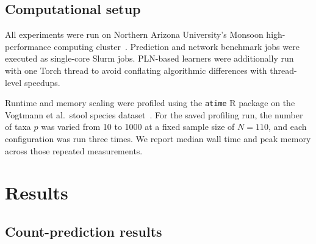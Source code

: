 \documentclass{jmlr}
\begin{document}
\subsection{Computational setup}
\label{subsec:computational-setup}

All experiments were run on Northern Arizona University's Monsoon high-performance computing cluster~\cite{Buechler2025MonsoonIntro}.
Prediction and network benchmark jobs were executed as single-core Slurm jobs.
PLN-based learners were additionally run with one Torch thread to avoid conflating algorithmic differences with thread-level speedups.

Runtime and memory scaling were profiled using the \texttt{atime} R package on the Vogtmann et al.\ stool species dataset~\cite{Vogtmann2016CRC}.
For the saved profiling run, the number of taxa $p$ was varied from 10 to 1000 at a fixed sample size of $N=110$, and each configuration was run three times.
We report median wall time and peak memory across those repeated measurements.


\section{Results}
\subsection{Count-prediction results}
\end{document}
